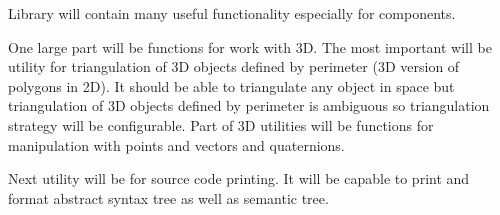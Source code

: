 Library will contain many useful functionality especially for components.

One large part will be functions for work with 3D.
The most important will be utility for triangulation of 3D objects defined by perimeter (3D version of polygons in 2D).
It should be able to triangulate any object in space but triangulation of 3D objects defined by perimeter is ambiguous so triangulation strategy will be configurable.
Part of 3D utilities will be functions for manipulation with points and vectors and quaternions.

Next utility will be for source code printing.
It will be capable to print and format abstract syntax tree as well as semantic tree.

























